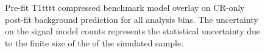 \begin{figure}[h!]
\begin{center}
{            \label{fig:T1tttt_compressed_MR_4j}
        } \\
         ~~
         \\
        \caption{
            Pre-fit T1tttt compressed benchmark model overlay on CR-only
            post-fit background prediction for all analysis bins. The
            uncertainty on the signal model counts represents the statistical
            uncertainty due to the finite size of the of the simulated sample.
        }
        \label{fig:T1tttt_compressed_MR}
    \end{center}
\end{figure}

